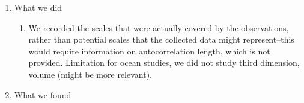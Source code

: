 \documentclass[12pt]{article}
\begin{document}
\begin{enumerate}
   \item{What we did}
   \begin{enumerate}
    \item We recorded the scales that were actually covered by the observations, rather than potential scales that the collected data might represent--this would require information on autocorrelation length, which is not provided. 
    \subitem Limitation for ocean studies, we did not study third dimension, volume (might be more relevant). 
   \end{enumerate}
   \item{What we found} 
   \begin{enumerate}

\end{enumerate}
\end{enumerate}
\end{document}
